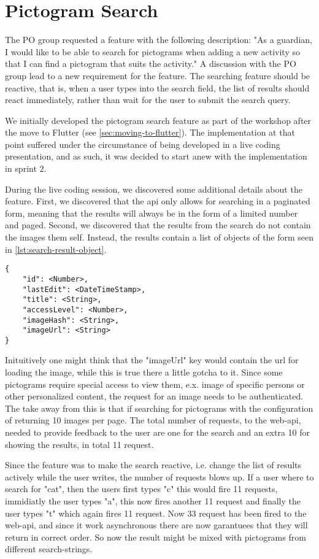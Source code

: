 \section{Pictogram Search}
The \gls{PO} group requested a feature with the following description: "As a guardian, I would like to be able to search for pictograms when adding a new activity so that I can find a pictogram that suits the activity." A discussion with the \gls{PO} group lead to a new requirement for the feature. The searching feature should be reactive, that is, when a user types into the search field, the list of results should react immediately, rather than wait for the user to submit the search query.

We initially developed the pictogram search feature as part of the workshop after the move to Flutter (see \autoref{sec:moving-to-flutter}). The implementation at that point suffered under the circumstance of being developed in a live coding presentation, and as such, it was decided to start anew with the implementation in sprint 2.

During the live coding session, we discovered some additional details about the feature. First, we discovered that the \gls{api} only allows for searching in a paginated form, meaning that the results will always be in the form of a limited number and paged. Second, we discovered that the results from the search do not contain the images them self. Instead, the results contain a list of objects of the form seen in \autoref{lst:search-result-object}.

\begin{lstlisting}
{
    "id": <Number>,
    "lastEdit": <DateTimeStamp>,
    "title": <String>,
    "accessLevel": <Number>,
    "imageHash": <String>,
    "imageUrl": <String>
}
\end{lstlisting}

Inituitively one might think that the "imageUrl" key would contain the url for loading the image, while this is true there a little gotcha to it. Since some pictograms require special access to view them, e.x. image of specific persons or other personalized content, the request for an image needs to be authenticated. The take away from this is that if searching for pictograms with the configuration of returning 10 images per page. The total number of requests, to the web-api, needed to provide feedback to the user are one for the search and an extra 10 for showing the results, in total 11 request.

Since the feature was to make the search reactive, i.e. change the list of results actively while the user writes, the number of requests blows up. If a user where to search for "cat", then the users first types "c" this would fire 11 requests, immidiatly the user types "a", this now fires another 11 request and finally the user types "t" which again fires 11 request. Now 33 request has been fired to the web-api, and since it work asynchronous there are now garantuees that they will return in correct order. So now the result might be mixed with pictograms from different search-strings.

